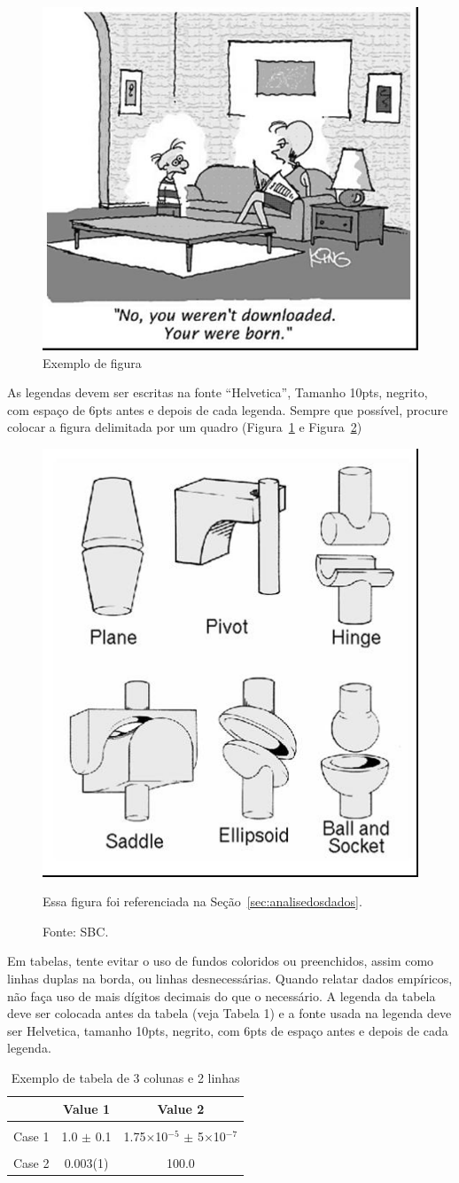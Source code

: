 \documentclass[12pt]{article}
\begin{document}
\begin{figure}[ht]
\centering
\includegraphics[width=.3\textwidth]{fig1.jpg}
\caption{Exemplo de figura}
\label{fig:figura1}
\end{figure}

As legendas devem ser escritas na fonte “Helvetica”, Tamanho 10pts, negrito, com espaço de 6pts antes e depois de cada legenda. Sempre que possível, procure colocar a figura delimitada por um quadro (Figura~\ref{fig:figura1} e Figura~\ref{fig:figura2})

\begin{figure}[!ht]
\centering
\includegraphics[width=.2\textwidth]{fig2.jpg}
\caption{Essa figura foi referenciada na Seção~\ref{sec:analisedosdados}.}
\caption{Fonte: SBC.}
\label{fig:figura2}
\end{figure}

Em tabelas, tente evitar o uso de fundos coloridos ou preenchidos, assim como linhas duplas na borda, ou linhas desnecessárias. Quando \cite{knuth:84} relatar dados empíricos, não faça uso de mais dígitos decimais do que o necessário. A legenda da tabela deve ser colocada antes da tabela (veja Tabela 1) e a fonte usada na legenda deve ser Helvetica, tamanho 10pts, negrito, com 6pts de espaço antes e depois de cada legenda.

\begin{table}[!ht]
\centering
\caption{Exemplo de tabela de 3 colunas e 2 linhas}
\label{tab:exTable1}
\smallskip
\begin{tabular}{l c c}
\hline
& Value 1 & Value 2\\[0.5ex]
\hline
&&\\[-2ex]
Case 1 & 1.0 $\pm$ 0.1 & 1.75$\times$10$^{-5}$ $\pm$ 5$\times$10$^{-7}$\\[0.5ex]
\hline
&&\\[-2ex]
Case 2 & 0.003(1) & 100.0\\[0.5ex]
\hline
\end{tabular}
\end{table}
\end{document}

